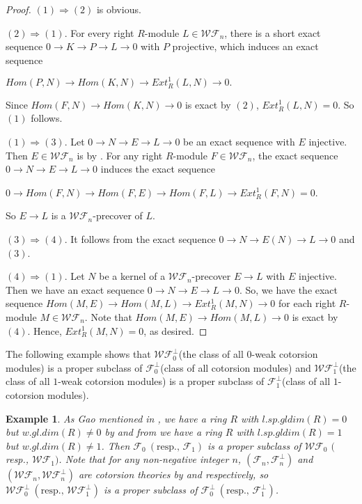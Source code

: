 ﻿\documentclass[
11pt,%
tightenlines,%
twoside,%
onecolumn,%
nofloats,%
nobibnotes,%
nofootinbib,%
superscriptaddress,%
noshowpacs,%
centertags]%
{revtex4}
\newtheorem{example}{Example}
\begin{document}
\begin{proof}
$(1) \Rightarrow (2)$ is obvious.

$(2) \Rightarrow (1)$. For every right $R$-module $L \in
\mathcal{WF}_n$,  there is a short exact sequence $0 \rightarrow K
\rightarrow P \rightarrow L \rightarrow 0$ with $P$ projective,
which induces an exact sequence
\begin{center}
$Hom(P,N) \rightarrow Hom(K,N) \rightarrow Ext_R^1(L,N) \rightarrow 0.$
\end{center}
Since $Hom(F,N) \rightarrow Hom(K,N) \rightarrow 0$ is exact by
$(2)$, $Ext_R^1(L,N) = 0$. So $(1)$ follows.

$(1) \Rightarrow (3)$. Let $0 \rightarrow N \rightarrow E
\rightarrow L \rightarrow 0$ be  an exact sequence with $E$
injective. Then $E \in \mathcal{WF}_n$ is  by \cite[Proposition
$4.11$]{Zo}.  For any right $R$-module $F \in \mathcal{WF}_n$, the
exact sequence $0 \rightarrow N \rightarrow E \rightarrow L
\rightarrow 0$ induces the exact sequence
\begin{center}
$0 \rightarrow Hom(F,N) \rightarrow Hom(F, E) \rightarrow Hom(F, L) \rightarrow Ext_R^1(F,N) = 0$.
\end{center}
So $E \rightarrow L$ is a $\mathcal{WF}_n$-precover of $L$.

$(3) \Rightarrow (4)$. It follows from the exact sequence  $0
\rightarrow N \rightarrow E(N) \rightarrow L \rightarrow 0$ and
$(3)$.
\par $(4) \Rightarrow (1)$. Let $N$ be a kernel of a $\mathcal{WF}_n$-precover
$E \rightarrow L$ with $E$ injective. Then we have an exact sequence $0 \rightarrow N \rightarrow E \rightarrow L \rightarrow 0$. So, we have the exact sequence $Hom(M,E) \rightarrow Hom(M,L) \rightarrow Ext_R^1(M,N) \rightarrow 0$ for each right $R$-module $M \in \mathcal{WF}_n$. Note that $Hom(M,E) \rightarrow Hom(M,L) \rightarrow 0$ is exact by $(4)$. Hence, $Ext_R^1(M,N) = 0$, as desired.
\end{proof}

 The following example shows that $\mathcal{WF}_0^\bot$(the class of
  all $0$-weak cotorsion modules) is a proper subclass of
  $\mathcal{F}_0^\bot$(class of all cotorsion modules) and
   $\mathcal{WF}_1^\bot$(the class of all $1$-weak cotorsion modules) is
   a proper subclass of $\mathcal{F}_1^\bot$(class of all $1$-cotorsion modules).
\begin{example}
 As Gao mentioned in \cite[Remark $3.11(2)$]{Gao}, we have a ring $R$
 with $l.sp.gldim(R) = 0$ but $w. gl.dim(R) \neq 0$ by \cite[Theorem $3.4$]{Mah} and from \cite{Cos}
 we have a ring $R$ with $l.sp.gldim(R) = 1$ but $w. gl.dim(R) \neq 1$.
 Then $\mathcal{F}_0 \ (\mbox{resp., } \mathcal{F}_1)$ is a proper subclass
 of $\mathcal{WF}_0$ $($resp., $\mathcal{WF}_1)$. Note that for any non-negative
 integer $n$, $(\mathcal{F}_n, \mathcal{F}_n^\bot)$ and $(\mathcal{WF}_n, \mathcal{WF}_n^\bot)$
 are cotorsion theories by \cite[Theorem $3.4(2)$]{MD} and \cite[Proposition $4.18$]{Zo} respectively,
 so $\mathcal{WF}_0^\bot \ (\mbox{resp., } \mathcal{WF}_1^\bot)$ is a proper subclass of
  $\mathcal{F}_0^\bot \ (\mbox{resp., } \mathcal{F}_1^\bot)$.
\end{example}
\end{document}
